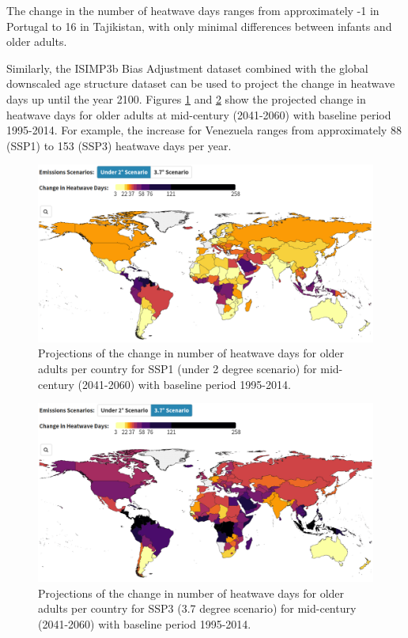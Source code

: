 \documentclass[
]{krantz}
\begin{document}
The change in the number of heatwave days ranges from approximately -1 in Portugal to 16 in Tajikistan, with only minimal differences between infants and older adults.

Similarly, the ISIMP3b Bias Adjustment dataset combined with the global downscaled age structure dataset can be used to project the change in heatwave days up until the year 2100. Figures \ref{fig:heatwaves2ssp1strobl} and \ref{fig:heatwaves2ssp3strobl} show the projected change in heatwave days for older adults at mid-century (2041-2060) with baseline period 1995-2014. For example, the increase for Venezuela ranges from approximately 88 (SSP1) to 153 (SSP3) heatwave days per year.

\begin{figure}
\includegraphics[width=1\linewidth]{work/08-lancet/figures/indicator_1_3} \caption{Projections of the change in number of heatwave days for older adults per country for SSP1 (under 2 degree scenario) for mid-century (2041-2060) with baseline period 1995-2014.}\label{fig:heatwaves2ssp1strobl}
\end{figure}
\begin{figure}
\includegraphics[width=1\linewidth]{work/08-lancet/figures/indicator_1_4} \caption{Projections of the change in number of heatwave days for older adults per country for SSP3 (3.7 degree scenario) for mid-century (2041-2060) with baseline period 1995-2014.}\label{fig:heatwaves2ssp3strobl}
\end{figure}
\end{document}
